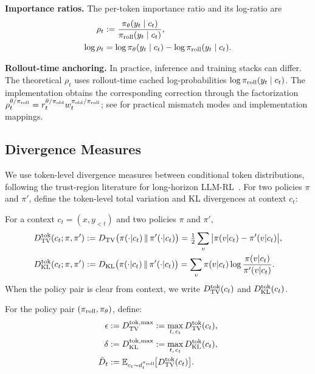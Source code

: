 \textbf{Importance ratios.} The per-token importance ratio and its log-ratio are
\begin{align}
    \rho_t
    &:= \frac{\pi_{\theta}(y_t \mid c_t)}{\pi_{\mathrm{roll}}(y_t \mid c_t)},
    \label{eq:ratio}
    \\
    \log\rho_t
    &= \log \pi_{\theta}(y_t \mid c_t) - \log \pi_{\mathrm{roll}}(y_t \mid c_t).
    \label{eq:log-ratio}
\end{align}

\textbf{Rollout-time anchoring.} In practice, inference and training stacks can
differ. The theoretical $\rho_t$ uses rollout-time cached log-probabilities
$\log \pi_{\mathrm{roll}}(y_t\mid c_t)$. The implementation obtains the corresponding
correction through the factorization
$\rho_t^{\theta/\pi_{\mathrm{roll}}}=r_t^{\theta/\pi_{\mathrm{old}}}w_t^{\pi_{\mathrm{old}}/\pi_{\mathrm{roll}}}$;
see  for practical mismatch modes and implementation
mappings.

\subsection{Divergence Measures}

We use token-level divergence measures between conditional token distributions, following the trust-region literature for long-horizon
LLM-RL~\citep{li2025trm}. For two policies $\pi$ and $\pi'$, define the token-level total variation and KL divergences at context $c_t$:

\begin{definition}
For a context $c_t = (x, y_{<t})$ and two policies $\pi$ and $\pi'$,
\begin{align*}
    D_{\mathrm{TV}}^{\mathrm{tok}}(c_t;\pi,\pi')
    &:= D_{\mathrm{TV}}\big(\pi(\cdot|c_t)\,\|\,\pi'(\cdot|c_t)\big)
    = \tfrac{1}{2}\sum_{v} \big|\pi(v|c_t) - \pi'(v|c_t)\big|, \\
    D_{\mathrm{KL}}^{\mathrm{tok}}(c_t;\pi,\pi')
    &:= D_{\mathrm{KL}}\big(\pi(\cdot|c_t)\,\|\,\pi'(\cdot|c_t)\big)
    = \sum_{v} \pi(v|c_t)\log\frac{\pi(v|c_t)}{\pi'(v|c_t)}.
\end{align*}
When the policy pair is clear from context, we write $D_{\mathrm{TV}}^{\mathrm{tok}}(c_t)$ and $D_{\mathrm{KL}}^{\mathrm{tok}}(c_t)$.
\end{definition}

\begin{definition}
\label{def:max-div}
For the policy pair $(\pi_{\mathrm{roll}},\pi_{\theta})$, define:
\begin{align*}
    \epsilon
    &:= D_{\mathrm{TV}}^{\mathrm{tok,max}} := \max_{t,\,c_t} D_{\mathrm{TV}}^{\mathrm{tok}}(c_t),
    \\
    \delta
    &:= D_{\mathrm{KL}}^{\mathrm{tok,max}} := \max_{t,\,c_t} D_{\mathrm{KL}}^{\mathrm{tok}}(c_t),
    \\
    \bar{D}_t
    &:= \mathbb{E}_{c_t \sim d_t^{\pi_{\mathrm{roll}}}}\!\big[D_{\mathrm{TV}}^{\mathrm{tok}}(c_t)\big].
\end{align*}
\end{definition}

